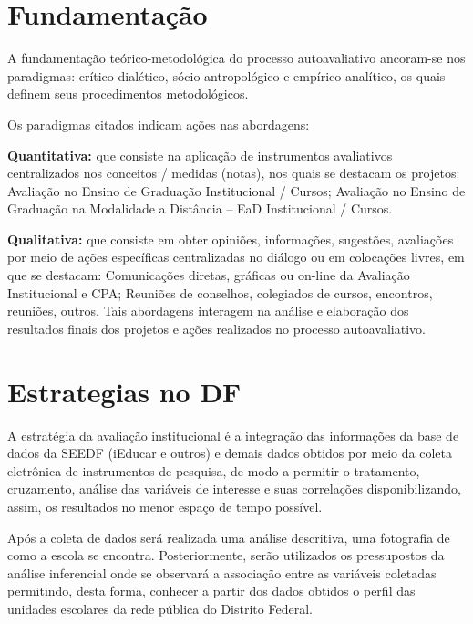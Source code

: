 \documentclass[final]{beamer}
\begin{document}
\begin{poster}
\newcolumn

\section{Fundamentação}
A fundamentação teórico-metodológica do processo autoavaliativo ancoram-se nos paradigmas: crítico-dialético, sócio-antropológico e empírico-analítico, os quais definem seus procedimentos metodológicos.

Os paradigmas citados indicam ações nas abordagens:

\textbf{Quantitativa:} que consiste na aplicação de instrumentos avaliativos centralizados nos conceitos / medidas (notas), nos quais se destacam os projetos:
Avaliação no Ensino de Graduação Institucional / Cursos; 
Avaliação no Ensino de Graduação na Modalidade a Distância – EaD Institucional / Cursos. 

\textbf{Qualitativa:} que consiste em obter opiniões, informações, sugestões, avaliações por meio de ações específicas centralizadas no diálogo ou em colocações livres, em que se destacam:
Comunicações diretas, gráficas ou on-line da Avaliação Institucional e CPA; 
Reuniões de conselhos, colegiados de cursos, encontros, reuniões, outros. 
Tais abordagens interagem na análise e elaboração dos resultados finais dos projetos e ações realizados no processo autoavaliativo.


\section{Estrategias no DF}
A estratégia da avaliação institucional é a integração das informações da base de dados da SEEDF (iEducar e outros) e demais dados obtidos por meio da coleta eletrônica de instrumentos de pesquisa, de modo a permitir o tratamento, cruzamento, análise das variáveis de interesse e suas correlações disponibilizando, assim, os resultados no menor espaço de tempo possível.

Após a coleta de dados será realizada uma análise descritiva, uma fotografia de como a escola se encontra. Posteriormente, serão utilizados os pressupostos da análise inferencial onde se observará a associação entre as variáveis coletadas permitindo, desta forma, conhecer a partir dos dados obtidos o perfil das unidades escolares da rede pública do Distrito Federal.





\end{poster}
\end{document}
